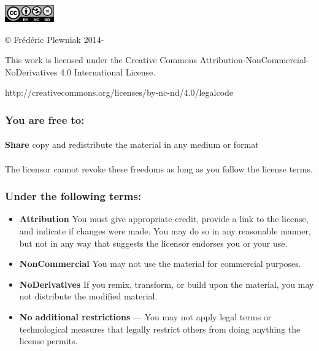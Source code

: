\scriptsize
\par\vspace*{\fill}
\begin{center}
\includegraphics[height=2em]{../../Licence/by-nc-nd}

\copyright{} Fr\'{e}d\'{e}ric Plewniak 2014-\the\year
\end{center}

\begin{center}
This work is licensed under the Creative Commons Attribution-NonCommercial-NoDerivatives 4.0 International License. 

http://creativecommons.org/licenses/by-nc-nd/4.0/legalcode
\end{center}
\medskip
\subsubsection{{\footnotesize You are free to:}}
\paragraph{}\textbf{Share} \textendash{} copy and redistribute the material in any medium or format
\paragraph{}The licensor cannot revoke these freedoms as long as you follow the license terms.

\subsubsection{{\footnotesize Under the following terms:}}
\begin{itemize}
\item{\textbf{Attribution}  \textendash{} You must give appropriate credit, provide a link to the license, and indicate if changes were made. You may do so in any reasonable manner, but not in any way that suggests the licensor endorses you or your use.}

\item{\textbf{NonCommercial}  \textendash{} You may not use the material for commercial purposes.}

\item{\textbf{NoDerivatives}  \textendash{} If you remix, transform, or build upon the material, you may not distribute the modified material.}

\item{\textbf{No additional restrictions} — You may not apply legal terms or technological measures that legally restrict others from doing anything the license permits.}
\end{itemize}

